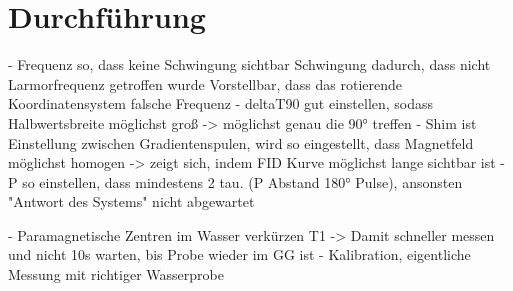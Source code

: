 \newpage
\section{Durchführung}
\label{sec:Durchführung}

- Frequenz so, dass keine Schwingung sichtbar
  Schwingung dadurch, dass nicht Larmorfrequenz getroffen wurde
  Vorstellbar, dass das rotierende Koordinatensystem falsche Frequenz
- deltaT90 gut einstellen, sodass Halbwertsbreite möglichst groß
  -> möglichst genau die 90° treffen
- Shim ist Einstellung zwischen Gradientenspulen, wird so eingestellt,
  dass Magnetfeld möglichst homogen
  -> zeigt sich, indem FID Kurve möglichst lange sichtbar ist
- P so einstellen, dass mindestens 2 tau. (P Abstand 180° Pulse),
  ansonsten "Antwort des Systems" nicht abgewartet


- Paramagnetische Zentren im Wasser verkürzen T1
  -> Damit schneller messen und nicht 10s warten, bis Probe wieder im GG ist
  - Kalibration, eigentliche Messung mit richtiger Wasserprobe

